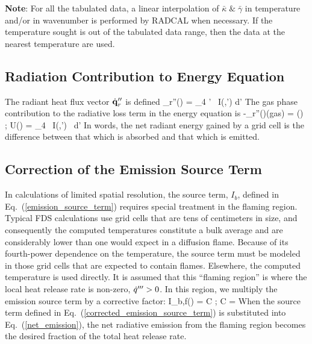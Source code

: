 \textbf{Note}: For all the tabulated data, a linear interpolation of $\bar{\kappa} \;\&\; \bar{\gamma}$ in temperature and/or in wavenumber is performed by RADCAL when necessary. If the temperature sought is out of the tabulated data range, then the data at the nearest temperature are used.

\subsection{Radiation Contribution to Energy Equation}

The radiant heat flux vector $\dot{\bf q}_r''$ is defined
\be \dbq_r''(\bx) = \int_{4\pi} \; \bs' \, I(\bx,\bs') \; d\bs'   \ee
The gas phase contribution to the radiative loss term in the energy equation is
\be -\nabla\!\cdot \dbq_r''(\bx)(\mbox{gas}) =
    \kappa(\bx) \, \left[ U(\bx) - 4 \pi \, I_b(\bx) \right]  \quad ; \quad
    U(\bx) = \int_{4\pi} \, I(\bx,\bs') \, d\bs'  \label{net_emission}
\ee
In words, the net radiant energy gained by a grid cell is the
difference between that which is absorbed and that which is emitted.

\subsection{Correction of the Emission Source Term}

In calculations of limited spatial resolution, the source term, $I_b$,
defined in Eq.~(\ref{emission_source_term}) requires special treatment in the flaming region. Typical FDS calculations
use grid cells that are tens of centimeters in size, and consequently the computed temperatures constitute a bulk average and are considerably lower than
one would expect in a diffusion flame.
Because of its fourth-power dependence on the temperature,
the source term must be modeled in those grid cells that are expected to contain flames. Elsewhere, the computed temperature is used directly.
It is assumed that this ``flaming region'' is where the local heat release rate is non-zero, $\dot{q}'''>0$. In this region, we
multiply the emission source term by a corrective factor:
\be I_{b,f}(\bx) = C    \quad ; \quad
    C =  \label{corrected_emission_source_term}
\ee
When the source term defined in Eq.~(\ref{corrected_emission_source_term}) is
substituted into Eq.~(\ref{net_emission}), the net radiative emission from the flaming region becomes the desired fraction of the total heat release rate.

